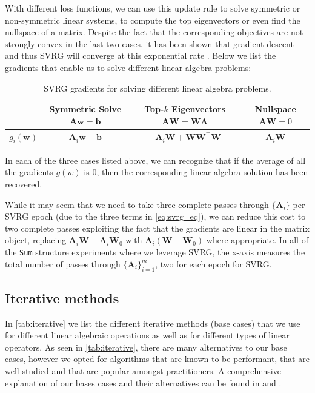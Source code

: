 \documentclass{article}
\newcommand{\mbf}[1]{{\boldsymbol{\mathbf{#1}}}}
\renewcommand{\bm}{\mbf}
\begin{document}
With different loss functions, we can use this update rule to solve symmetric or non-symmetric linear systems, to compute the top eigenvectors or even find the nullspace of a matrix. Despite the fact that the corresponding objectives are not strongly convex in the last two cases, it has been shown that gradient descent and thus SVRG will converge at this exponential rate \citep{xu2018accelerated,finzi2021practical}.
Below we list the gradients that enable us to solve different linear algebra problems:
\begin{table}[ht]
\centering
\begin{tabular}{|c|c|c|c|}
\hline
 & Symmetric Solve $\bm{A} \bm{w} = \bm{b}$ & Top-$k$ Eigenvectors $\bm A\bm W = \bm W\bm \Lambda$ & Nullspace $\bm A\bm W=0$\\
\hline
  $g_i(\bm{w})$ & $\bm{A}_i \bm{w} - \bm{b}$ & $-\bm A_i\bm W+\bm W\bm W^{\intercal} \bm W$ \citep{xu2018accelerated} & $\bm A_i\bm{W}$ \citep{finzi2021practical}\\
\hline
\end{tabular}
\vspace{1mm}
\caption{SVRG gradients for solving different linear algebra problems.}
\label{your_label}
\end{table}
In each of the three cases listed above, we can recognize that if the average of all the gradients $g(w)$ is $0$, then the corresponding linear algebra solution has been recovered.

While it may seem that we need to take three complete passes through $\{\bm A_i\}$ per SVRG epoch (due to the three terms in \autoref{eq:svrg_eq}), we can reduce this cost to two
complete passes exploiting the fact that the gradients are linear in the matrix object, replacing $\bm A_i \bm W - \bm A_i \bm W_0$ with $\bm A_i(\bm W-\bm W_0)$ where appropriate.
In all of the \texttt{Sum} structure experiments where we leverage SVRG, the x-axis measures the total number of passes through $\{\bm A_i\}_{i=1}^m$, two for each epoch for SVRG.

\subsection{Iterative methods} \label{app:iterative}
In \autoref{tab:iterative} we list the different iterative methods (base cases) that we use for different linear algebraic operations as well as for different types of linear operators.
As seen in \autoref{tab:iterative}, there are many alternatives to our base cases, however we opted for algorithms that are known to be performant, that are well-studied and that
are popular amongst practitioners.
A comprehensive explanation of our bases cases and their alternatives can be found in \citet{golub2018matrix} and \citet{saad2003iterative}.
\end{document}
